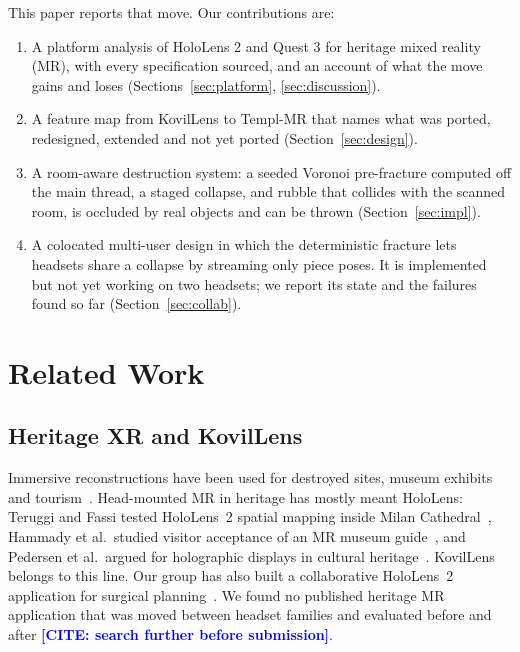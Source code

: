 \documentclass[conference]{IEEEtran}
\newcommand{\CITE}[1]{\textcolor{blue}{\textbf{[CITE#1]}}}
\begin{document}
This paper reports that move. Our contributions are:
\begin{enumerate}
\item A platform analysis of HoloLens 2 and Quest 3 for heritage mixed reality (MR), with every specification sourced, and an account of what the move gains and loses (Sections~\ref{sec:platform}, \ref{sec:discussion}).
\item A feature map from KovilLens to Templ-MR that names what was ported, redesigned, extended and not yet ported (Section~\ref{sec:design}).
\item A room-aware destruction system: a seeded Voronoi pre-fracture computed off the main thread, a staged collapse, and rubble that collides with the scanned room, is occluded by real objects and can be thrown (Section~\ref{sec:impl}).
\item A colocated multi-user design in which the deterministic fracture lets headsets share a collapse by streaming only piece poses. It is implemented but not yet working on two headsets; we report its state and the failures found so far (Section~\ref{sec:collab}).
\end{enumerate}

\section{Related Work}

\subsection{Heritage XR and KovilLens}
Immersive reconstructions have been used for destroyed sites, museum exhibits and tourism~\cite{innocente2023,bec2021,bozzelli2019}. Head-mounted MR in heritage has mostly meant HoloLens: Teruggi and Fassi tested HoloLens~2 spatial mapping inside Milan Cathedral~\cite{teruggi2022}, Hammady et al.\ studied visitor acceptance of an MR museum guide~\cite{hammady2020}, and Pedersen et al.\ argued for holographic displays in cultural heritage~\cite{pedersen2017}. KovilLens~\cite{kovillens2025} belongs to this line. Our group has also built a collaborative HoloLens~2 application for surgical planning~\cite{prabhakaran2024}. We found no published heritage MR application that was moved between headset families and evaluated before and after \CITE{: search further before submission}.
\end{document}
